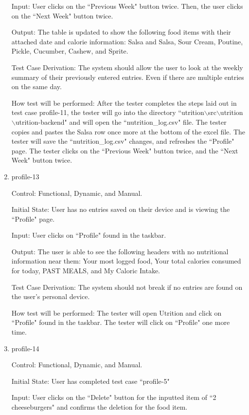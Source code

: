 \documentclass[12pt, titlepage]{article}
\begin{document}
\begin{enumerate}
		Input: User clicks on the ``Previous Week" button twice. Then, the user clicks on the ``Next Week" button twice.
		
		Output: The table is updated to show the following food items with their attached date and calorie information: Salsa and Salsa, Sour Cream, Poutine, Pickle, Cucumber, Cashew, and Sprite.
		
		Test Case Derivation: The system should allow the user to look at the weekly summary of their previously entered entries. Even if there are multiple entries on the same day.
		
		How test will be performed: After the tester completes the steps laid out in test case profile-11, the tester will go into the directory ``utrition$\backslash$src$\backslash$utrition$\backslash$utrition-backend" and will open the ``nutrition\_log.csv" file. The tester copies and pastes the Salsa row once more at the bottom of the excel file. The tester will save the ``nutrition\_log.csv" changes, and refreshes the ``Profile" page. The tester clicks on the ``Previous Week" button twice, and the ``Next Week" button twice.
		
		\item{profile-13\\}
		
		Control: Functional, Dynamic, and Manual.
		
		Initial State: User has no entries saved on their device and is viewing the ``Profile" page.
		
		Input: User clicks on ``Profile" found in the taskbar.
		
		Output: The user is able to see the following headers with no nutritional information near them: Your most logged food, Your total calories consumed for today, PAST MEALS, and My Caloric Intake.
		
		Test Case Derivation: The system should not break if no entries are found on the user's personal device.
		
		How test will be performed: The tester will open Utrition and click on ``Profile" found in the taskbar. The tester will click on ``Profile" one more time.
		
		\item{profile-14\\}
		
		Control: Functional, Dynamic, and Manual.
		
		Initial State: User has completed test case ``profile-5"
		
		Input: User clicks on the ``Delete" button for the inputted item of ``2 cheeseburgers" and confirms the deletion for the food item.
		

\end{enumerate}
\end{document}
